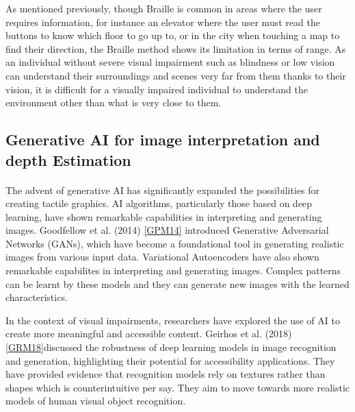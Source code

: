 \documentclass[12pt, letterpaper]{article}
\begin{document}
\begin{spacing}{1.15}
As mentioned previously, though Braille is common in areas where the user requires information, for instance an elevator where the user must read the buttons to know which floor to
go up to, or in the city when touching a map to find their direction, the Braille method shows its limitation in terms of range. As an individual without severe visual impairment such
as blindness or low vision can understand their surroundings and scenes very far from them thanks to their vision, it is difficult for a visually impaired individual to understand
the environment other than what is very close to them.

\subsection{Generative AI for image interpretation and depth Estimation}
\paragraph{}
The advent of generative AI has significantly expanded the possibilities for creating tactile graphics. AI algorithms, particularly those based on deep learning, have shown
remarkable capabilities in interpreting and generating images. Goodfellow et al. (2014) \hyperlink{GPM14target}{[GPM14]} introduced Generative Adversarial Networks (GANs), which have become a foundational
tool in generating realistic images from various input data. Variational Autoencoders have also shown remarkable capabilites in interpreting and generating images. Complex patterns can
be learnt by these models and they can generate new images with the learned characteristics.

In the context of visual impairments, researchers have explored the use of AI to create more meaningful and accessible content. Geirhos et al. (2018) \hyperlink{GMR18target}{[GRM18]}discussed the robustness of
deep learning models in image recognition and generation, highlighting their potential for accessibility applications. They have provided evidence that recognition models rely on
textures rather than shapes which is counterintuitive per say. They aim to move towards more realistic models of human visual object recognition.


\end{spacing}
\end{document}
